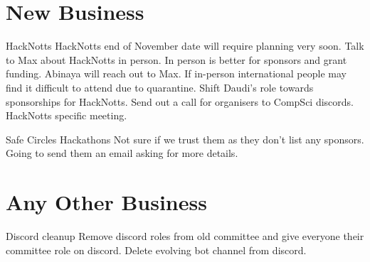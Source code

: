 \documentclass[11pt,hacksoc]{meetingmins}
\begin{document}
\section{New Business}
\begin{items}
\item {HackNotts}
\subitem HackNotts end of November date will require planning very soon.
\subitem Talk to Max about HackNotts in person. In person is better for sponsors and grant funding.
\subitem Abinaya will reach out to Max.
\subitem If in-person international people may find it difficult to attend due to quarantine.
\subitem Shift Daudi’s role towards sponsorships for HackNotts.
\subitem Send out a call for organisers to CompSci discords.
\subitem HackNotts specific meeting.

\item {Safe Circles Hackathons}
\subitem Not sure if we trust them as they don’t list any sponsors.
\subitem Going to send them an email asking for more details.
\end{items}

\section{Any Other Business}
\begin{items}
\item Discord cleanup
\subitem Remove discord roles from old committee and give everyone their committee role on discord.
\subitem Delete evolving bot channel from discord.
\end{items}

\vspace{1em}
\end{document}
